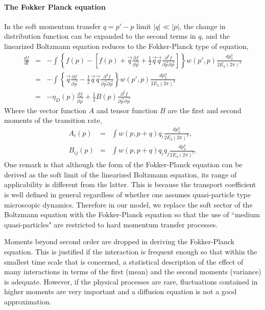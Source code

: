 \paragraph{The Fokker Planck equation}
In the soft momentum transfer $q = p'-p$ limit  $|q| \ll |p|$, the change in distribution function can be expanded to the second terms in $q$, and the linearized Boltzmann equation reduces to the Fokker-Planck type of equation,
\begin{eqnarray}
\frac{df}{dt} &=& - \int \left\{
f(p) - \left[f(p) +  \vec{q}\frac{\partial f}{\partial\vec{p}} + \frac{1}{2}\vec{q}\vec{q}\frac{\partial^2 f}{\partial\vec{p} \partial\vec{p}} \right]
\right\} w(p',p)\frac{dp_3^3}{2E_3 (2\pi)^3} \\
&=& - \int \left\{ \vec{q}\frac{\partial f}{\partial\vec{p}} - \frac{1}{2}\vec{q}\vec{q}\frac{\partial^2 f}{\partial\vec{p} \partial\vec{p}}
\right\} w(p',p)\frac{dp_3^3}{2E_3 (2\pi)^3} \\
&=&  -\eta_D(p) \frac{\partial f}{\partial\vec{p}} + \frac{1}{2}B(p)\frac{\partial^2 f}{\partial\vec{p} \partial\vec{p}}
\end{eqnarray}
Where the vector function $A$ and tensor function $B$ are the first and second moments of the transition rate,
\begin{eqnarray}
A_i(p) &=& \int w(p,p+q) q_i \frac{dp_3^3}{2E_3 (2\pi)^3},\\
B_{ij}(p) &=& \int w(p,p+q) q_i q_j \frac{dp_3^3}{2E_3 (2\pi)^3}.
\end{eqnarray}
One remark is that although the form of the Fokker-Planck equation can be derived as the soft limit of the linearized Boltzmann equation, its range of applicability is different from the latter.
This is because the transport coefficient is well defined in general regardless of whether one assumes quasi-particle type microscopic dynamics.
Therefore in our model, we replace the soft sector of the Boltzmann equation with the Fokker-Planck equation so that the use of ``medium quasi-particles" are restricted to hard momentum transfer processes.

Moments beyond second order are dropped in deriving the Fokker-Planck equation. 
This is justified if the interaction is frequent enough so that within the smallest time scale that is concerned, a statistical description of the effect of many interactions in terms of the first (mean) and the second moments (variance) is adequate.
However, if the physical processes are rare, fluctuations contained in higher moments are very important and a diffusion equation is not a good approximation.

